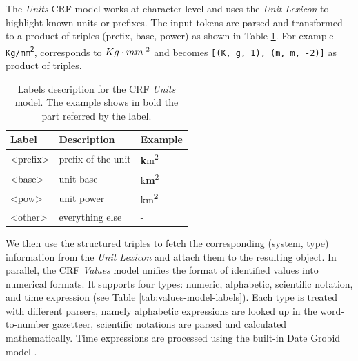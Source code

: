 \documentclass[sigconf]{acmart}
\begin{document}
The \textit{Units} CRF model works at character level and uses the \textit{Unit Lexicon} to highlight known units or prefixes. The input tokens are parsed and transformed to a product of triples (prefix, base, power) as shown in Table \ref{tab:units-model-labels}. For example \texttt{Kg/mm\textsuperscript{2}}, corresponds to \texttt{$Kg\cdot mm\textsuperscript{-2}$} and becomes \texttt{[(K, g, 1), (m, m, -2)]} as product of triples. 

\begin{table}[ht]
  \caption{Labels description for the CRF \textit{Units} model. The example shows in bold the part referred by the label. }
  \label{tab:units-model-labels}
  \begin{tabular}{lll}
    \toprule
    Label & Description & Example\\
    \midrule
    <prefix> & prefix of the unit  & \textbf{k}m\textsuperscript{2} \\
    <base> & unit base & k\textbf{m}\textsuperscript{2}\\
    <pow> & unit power & km\textsuperscript{\textbf{2}}\\
    <other> & everything else & - \\
  \bottomrule
\end{tabular}
\end{table}

We then use the structured triples to fetch the corresponding (system, type) information from the \textit{Unit Lexicon} and attach them to the resulting object. 
In parallel, the CRF \textit{Values} model unifies the format of identified values into numerical formats. It supports four types: numeric, alphabetic, scientific notation, and time expression (see Table \ref{tab:values-model-labels}). Each type is treated with different parsers, namely alphabetic expressions are looked up in the word-to-number gazetteer, scientific notations are parsed and calculated mathematically. Time expressions are processed using the built-in Date Grobid model \cite{GROBID}.
\end{document}
